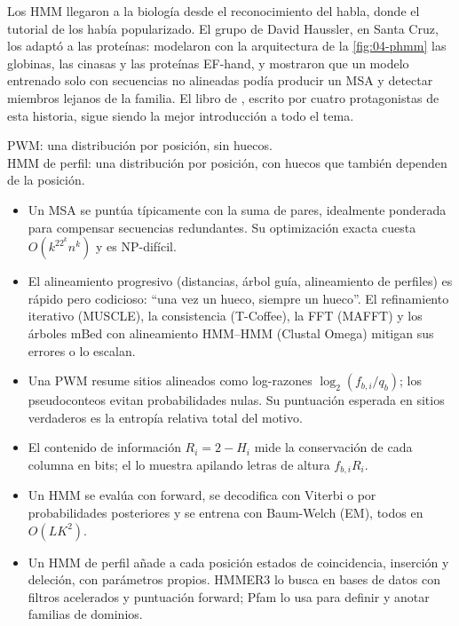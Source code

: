 \begin{historia}
Los HMM llegaron a la biología desde el reconocimiento del habla, donde el tutorial de \textcite{c04-rabiner1989} los había popularizado. El grupo de David Haussler, en Santa Cruz, los adaptó a las proteínas: \textcite{c04-krogh1994} modelaron con la arquitectura de la \cref{fig:04-phmm} las globinas, las cinasas y las proteínas EF-hand, y mostraron que un modelo entrenado solo con secuencias no alineadas podía producir un MSA y detectar miembros lejanos de la familia. El libro de \textcite{c04-durbin1998}, escrito por cuatro protagonistas de esta historia, sigue siendo la mejor introducción a todo el tema.
\end{historia}

\begin{ideaclave}
PWM: una distribución por posición, sin huecos.\\
HMM de perfil: una distribución por posición, con huecos que también dependen de la posición.
\end{ideaclave}

\begin{resumen}
\begin{itemize}
  \item Un MSA se puntúa típicamente con la suma de pares, idealmente ponderada para compensar secuencias redundantes. Su optimización exacta cuesta $O(k^22^kn^k)$ y es NP-difícil.
  \item El alineamiento progresivo (distancias, árbol guía, alineamiento de perfiles) es rápido pero codicioso: ``una vez un hueco, siempre un hueco''. El refinamiento iterativo (MUSCLE), la consistencia (T-Coffee), la FFT (MAFFT) y los árboles mBed con alineamiento HMM--HMM (Clustal Omega) mitigan sus errores o lo escalan.
  \item Una PWM resume sitios alineados como log-razones $\log_2(f_{b,i}/q_b)$; los pseudoconteos evitan probabilidades nulas. Su puntuación esperada en sitios verdaderos es la entropía relativa total del motivo.
  \item El contenido de información $R_i=2-H_i$ mide la conservación de cada columna en bits; el  lo muestra apilando letras de altura $f_{b,i}R_i$.
  \item Un HMM se evalúa con forward, se decodifica con Viterbi o por probabilidades posteriores y se entrena con Baum-Welch (EM), todos en $O(LK^2)$.
  \item Un HMM de perfil añade a cada posición estados de coincidencia, inserción y deleción, con parámetros propios. HMMER3 lo busca en bases de datos con filtros acelerados y puntuación forward; Pfam lo usa para definir y anotar familias de dominios.
\end{itemize}
\end{resumen}

